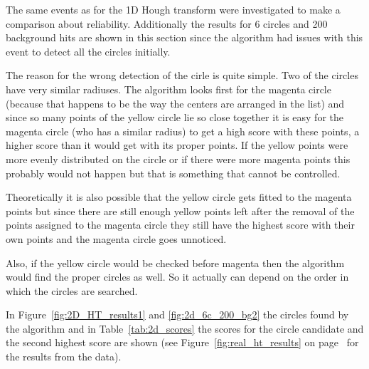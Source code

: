 \documentclass[11pt]{scrreprt}
\begin{document}
The same events as for the 1D
Hough transform were investigated to make a comparison about reliability. Additionally the results for 6 circles
and 200 background hits are shown in this section since the algorithm had issues with this event to detect
all the circles initially. 

The reason for the wrong detection of the cirle is quite simple. Two of the circles have very similar radiuses. 
The algorithm looks first for the magenta circle (because that happens to be the way the centers are arranged in the list) 
and since so many points of the yellow circle lie so close together it is easy for the magenta circle (who has a similar radius) 
to get a high score with these points, a higher score than it would get with its proper points. If the yellow points were more evenly 
distributed on the circle or if there were more magenta points this probably would not happen but that is something that cannot be controlled.

Theoretically it is also possible that the yellow circle gets fitted to the
magenta points but since there are still enough yellow points left after the removal 
of the points assigned to the magenta circle they still have the highest score with 
their own points and the magenta circle goes unnoticed.

Also, if the yellow circle would be checked before magenta then the algorithm
would find the proper circles as well. So it actually can depend on the order
in which the circles are searched.

In Figure~\ref{fig:2D_HT_results1} and \ref{fig:2d_6c_200_bg2} the circles found by the algorithm and in Table~\ref{tab:2d_scores} the scores
for the circle candidate and the second highest score are shown (see Figure~\ref{fig:real_ht_results} on page~\pageref{fig:real_ht_results}
for the results from the data).
\end{document}

